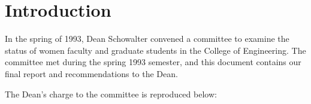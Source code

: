 \maketitle







\begin{abstract}

\sloppy  

In the spring of 1993, Dean Schowalter convened a committee
to examine the status of women faculty and graduate students
in the College of Engineering.  
This document contains the committee's final report and recommendations
to the Dean.

\end{abstract}

\section{Introduction}

In the spring of 1993, Dean Schowalter convened a committee
to examine the status of women faculty and graduate students
in the College of Engineering.  
The committee met during the spring 1993 semester, and
this document contains our final report and recommendations
to the Dean.

The Dean's charge to the committee is reproduced below:

